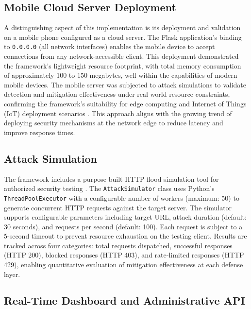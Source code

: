 \documentclass[conference]{IEEEtran}
\begin{document}
\subsection{Mobile Cloud Server Deployment}

A distinguishing aspect of this implementation is its deployment and validation on a mobile phone configured as a cloud server. The Flask application's binding to \texttt{0.0.0.0} (all network interfaces) enables the mobile device to accept connections from any network-accessible client. This deployment demonstrated the framework's lightweight resource footprint, with total memory consumption of approximately 100 to 150 megabytes, well within the capabilities of modern mobile devices. The mobile server was subjected to attack simulations to validate detection and mitigation effectiveness under real-world resource constraints, confirming the framework's suitability for edge computing and Internet of Things (IoT) deployment scenarios \cite{b11}. This approach aligns with the growing trend of deploying security mechanisms at the network edge to reduce latency and improve response times.

\subsection{Attack Simulation}

The framework includes a purpose-built HTTP flood simulation tool for authorized security testing \cite{b25}. The \texttt{AttackSimulator} class uses Python's \texttt{ThreadPoolExecutor} with a configurable number of workers (maximum: 50) to generate concurrent HTTP requests against the target server. The simulator supports configurable parameters including target URL, attack duration (default: 30 seconds), and requests per second (default: 100). Each request is subject to a 5-second timeout to prevent resource exhaustion on the testing client. Results are tracked across four categories: total requests dispatched, successful responses (HTTP 200), blocked responses (HTTP 403), and rate-limited responses (HTTP 429), enabling quantitative evaluation of mitigation effectiveness at each defense layer.

\subsection{Real-Time Dashboard and Administrative API}
\end{document}
